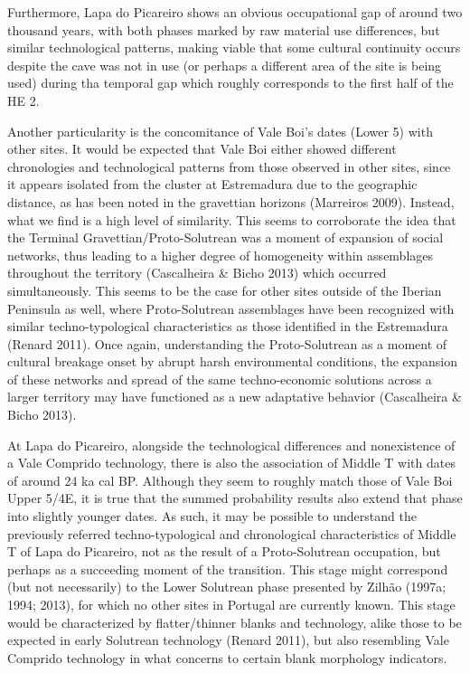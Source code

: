 \documentclass[12pt,twoside]{reedthesis}
\begin{document}
Furthermore, Lapa do Picareiro shows an obvious occupational gap of around two thousand years, with both phases marked by raw material use differences, but similar technological patterns, making viable that some cultural continuity occurs despite the cave was not in use (or perhaps a different area of the site is being used) during tha temporal gap which roughly corresponds to the first half of the HE 2.

Another particularity is the concomitance of Vale Boi's dates (Lower 5) with other sites. It would be expected that Vale Boi either showed different chronologies and technological patterns from those observed in other sites, since it appears isolated from the cluster at Estremadura due to the geographic distance, as has been noted in the gravettian horizons (Marreiros 2009). Instead, what we find is a high level of similarity. This seems to corroborate the idea that the Terminal Gravettian/Proto-Solutrean was a moment of expansion of social networks, thus leading to a higher degree of homogeneity within assemblages throughout the territory (Cascalheira \& Bicho 2013) which occurred simultaneously. This seems to be the case for other sites outside of the Iberian Peninsula as well, where Proto-Solutrean assemblages have been recognized with similar techno-typological characteristics as those identified in the Estremadura (Renard 2011). Once again, understanding the Proto-Solutrean as a moment of cultural breakage onset by abrupt harsh environmental conditions, the expansion of these networks and spread of the same techno-economic solutions across a larger territory may have functioned as a new adaptative behavior (Cascalheira \& Bicho 2013).

At Lapa do Picareiro, alongside the technological differences and nonexistence of a Vale Comprido technology, there is also the association of Middle T with dates of around 24 ka cal BP. Although they seem to roughly match those of Vale Boi Upper 5/4E, it is true that the summed probability results also extend that phase into slightly younger dates. As such, it may be possible to understand the previously referred techno-typological and chronological characteristics of Middle T of Lapa do Picareiro, not as the result of a Proto-Solutrean occupation, but perhaps as a succeeding moment of the transition. This stage might correspond (but not necessarily) to the Lower Solutrean phase presented by Zilhão (1997a; 1994; 2013), for which no other sites in Portugal are currently known. This stage would be characterized by flatter/thinner blanks and technology, alike those to be expected in early Solutrean technology (Renard 2011), but also resembling Vale Comprido technology in what concerns to certain blank morphology indicators.
\end{document}
